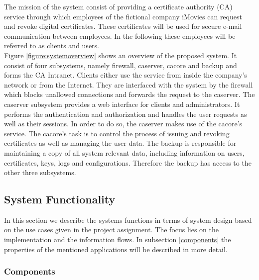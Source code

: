 \documentclass[english]{article}
\begin{document}
The mission of the system consist of providing a certificate authority (CA) service through which employees of the fictional company iMovies can request and revoke digital certificates. These certificates will be used for secure e-mail communication between employees. In the following these employees will be referred to as clients and users.\\
Figure {\ref{figure:systemoverview}} shows an overview of the proposed system. It consist of four subsystems, namely firewall, caserver, cacore and backup and forms the CA Intranet. Clients either use the service from inside the company's network or from the Internet. They are interfaced with the system by the firewall which blocks unallowed connections and forwards the request to the caserver. The caserver subsystem provides a web interface for clients and administrators. It performs the authentication and authorization and handles the user requests as well as their sessions. In order to do so, the caserver makes use of the cacore's service. The cacore's task is to control the process of issuing and revoking certificates as well as managing the user data. The backup is responsible for maintaining a copy of all system relevant data, including information on users, certificates, keys, logs and configurations. Therefore the backup has access to the other three subsystems.



\subsection{System Functionality} 
 In this section we describe the systems functions in terms of system design based on the use cases given in the project assignment. The focus lies on the implementation and the information flows. In subsection \ref{components} the properties of the mentioned applications will be described in more detail.
 
 \subsubsection{Components}\label{compfunc}
\end{document}

